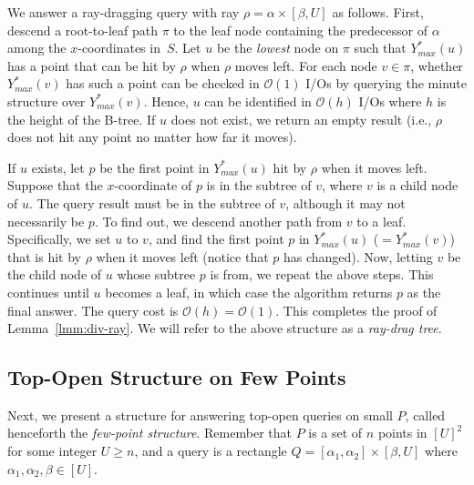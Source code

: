 \documentclass{sig-alternate}
\newcommand{\bigO}{\mathcal{O}}
\renewcommand{\(}{\left(}
\renewcommand{\)}{\right)}
\begin{document}
We answer a ray-dragging query with ray $\rho = \alpha \times [\beta, U]$ as follows. First, descend a root-to-leaf path $\pi$ to the leaf node containing the predecessor of $\alpha$ among the $x$-coordinates in~$S$. Let $u$ be the {\em lowest} node on $\pi$ such that $Y^*_{max}(u)$ has a point that can be hit by $\rho$ when $\rho$ moves left. For each node $v \in \pi$, whether $Y^*_{max}(v)$ has such a point can be checked in $\bigO(1)$ I/Os by querying the minute structure over $Y^*_{max}(v)$. Hence, $u$ can be identified in $\bigO(h)$ I/Os where $h$ is the height of the B-tree. If $u$ does not exist, we return an empty result (i.e., $\rho$ does not hit any point no matter how far it moves).

If $u$ exists, let $p$ be the first point in $Y^*_{max}(u)$ hit by $\rho$ when it moves left. Suppose that the $x$-coordinate of $p$ is in the subtree of $v$, where $v$ is a child node of $u$. The query result must be in the subtree of $v$, although it may not necessarily be $p$. To find out, we descend another path from $v$ to a leaf. Specifically, we set $u$ to $v$, and find the first point $p$ in $Y^*_{max}(u)$ ($= Y^*_{max}(v)$) that is hit by $\rho$ when it moves left (notice that $p$ has changed). Now, letting $v$ be the child node of $u$ whose subtree $p$ is from, we repeat the above steps. This continues until $u$ becomes a leaf, in which case the algorithm returns $p$ as the final answer.
The query cost is $\bigO(h) = \bigO(1)$. This completes the proof of Lemma~\ref{lmm:div-ray}. We will refer to the above structure as a {\em ray-drag tree}.


\subsection{Top-Open Structure on Few Points} \label{sec:div-topopen}


Next, we present a structure for answering top-open queries on small $P$, called henceforth the {\em few-point structure}. Remember that $P$ is a set of $n$ points in $[U]^2$ for some integer $U \ge n$, and a query is a rectangle $Q = [\alpha_1, \alpha_2] \times [\beta, U]$ where $\alpha_1, \alpha_2, \beta \in [U]$.
\end{document}
